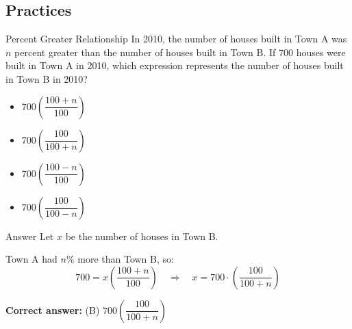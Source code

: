 \documentclass{beamer}
\begin{document}
\begin{frame}
\section{Practices}
\end{frame}


\begin{frame}{Percent Greater Relationship}
In 2010, the number of houses built in Town A was $n$ percent greater than the number of houses built in Town B. If $700$ houses were built in Town A in 2010, which expression represents the number of houses built in Town B in 2010?
\begin{itemize}
    \item[(A)] $700 \left( \dfrac{100 + n}{100} \right)$
    \item[(B)] $700 \left( \dfrac{100}{100 + n} \right)$
    \item[(C)] $700 \left( \dfrac{100 - n}{100} \right)$
    \item[(D)] $700 \left( \dfrac{100}{100 - n} \right)$
\end{itemize}
\end{frame}


\begin{frame}{Answer}
Let $x$ be the number of houses in Town B.

Town A had $n\%$ more than Town B, so:
\[
700 = x \left( \dfrac{100 + n}{100} \right)
\quad \Rightarrow \quad
x = 700 \cdot \left( \dfrac{100}{100 + n} \right)
\]

\textbf{Correct answer:} (B) $700 \left( \dfrac{100}{100 + n} \right)$
\end{frame}
\end{document}
